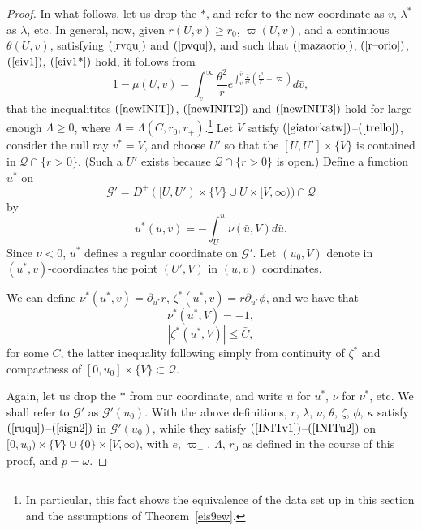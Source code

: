 \documentclass{article}
\begin{document}
\begin{proof}
In what follows, let us drop the $*$, and refer to the
new coordinate as $v$, $\lambda^*$ as $\lambda$, etc.
In general, now, given $r(U,v)\ge r_0$, $\varpi(U,v)$,
and a continuous $\theta(U,v)$, satisfying $(\ref{rvqu})$ and
$(\ref{pvqu})$, and such that $(\ref{mazaorio})$, $(\ref{r--orio})$, 
$(\ref{eiv1})$, $(\ref{eiv1*})$ hold, 
it follows from 
\[
1-\mu(U,v)=\int_v^\infty{\frac{\theta^2}
re^{\int_v^{\bar{v}}{\frac2{r^2}\left(\frac{e^2}r-
\varpi\right)}}d\bar{v}},
\]
that the inequalitites $(\ref{newINIT})$, $(\ref{newINIT2})$
and $(\ref{newINIT3})$ hold for large enough $\Lambda\ge 0$, where
$\Lambda=\Lambda(C, r_0, r_+)$.\footnote{In particular, this fact shows
the equivalence of the data set up in this section and 
the assumptions of Theorem~\ref{eis9ew}.}
Let $V$ satisfy $(\ref{giatorkatw})$--$(\ref{trello})$, 
consider the null ray $v^*=V$, and choose $U'$ so that
the $[U,U']\times\{V\}$ is
contained in $\mathcal{Q}\cap\{r>0\}$. (Such a $U'$ exists
because $\mathcal{Q}\cap\{r>0\}$ is open.)
Define a function $u^*$ on
\[
\mathcal{G}'=D^+([U,U')\times\{V\}\cup U\times[V,\infty))\cap \mathcal{Q}
\]
by 
\[
u^*(u,v)=-\int_U^u\nu(\bar{u},V)d\bar{u}.
\]
Since $\nu<0$, $u^*$ defines a regular
coordinate on $\mathcal{G}'$. Let $(u_0,V)$ denote in $(u^*,v)$-coordinates
the point $(U',V)$ in $(u,v)$ coordinates.

We can define $\nu^*(u^*,v)=\partial_{u^*}r$, 
$\zeta^*(u^*,v)=r\partial_{u^*}\phi$,
and we have that 
\[
\nu^*(u^*,V)=-1,
\]
\[
|\zeta^*(u^*,V)|\le\bar{C},
\]
for some $\bar{C}$, the latter inequality following simply from continuity
of $\zeta^*$ and compactness of $[0,u_0]\times\{V\}\subset\mathcal{Q}$.
 
Again, let us drop the $*$ from our coordinate, and write
$u$ for $u^*$, $\nu$ for $\nu^*$, etc. We shall refer
to $\mathcal{G}'$ as $\mathcal{G}'(u_0)$.
With the above definitions, $r$, $\lambda$, $\nu$,
$\theta$, $\zeta$, $\phi$, $\kappa$ satisfy  
$(\ref{ruqu})$--$(\ref{sign2})$ in $\mathcal{G}'(u_0)$, 
while they satisfy
$(\ref{INITv1})$--$(\ref{INITu2})$ on 
$[0,u_0)\times\{V\}\cup\{0\}\times[V,\infty)$,
with $e$, $\varpi_+$, $\Lambda$, $r_0$ as defined in the course of this proof,
and $p=\omega$. 
\end{proof}
\end{document}

